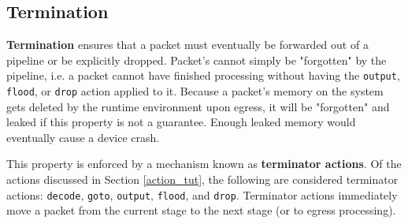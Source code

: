 %
%

\subsection{Termination} \label{termination_guide}

\textbf{Termination} ensures that a packet must eventually be forwarded out of a pipeline or be explicitly dropped. Packet's cannot simply be "forgotten" by the pipeline, i.e. a packet cannot have finished processing without having the \texttt{output}, \texttt{flood}, or \texttt{drop} action applied to it. Because a packet's memory on the system gets deleted by the runtime environment upon egress, it will be "forgotten" and leaked if this property is not a guarantee. Enough leaked memory would eventually cause a device crash.

This property is enforced by a mechanism known as \textbf{terminator actions}. Of the actions discussed in Section \ref{action_tut}, the following are considered terminator actions: \texttt{decode}, \texttt{goto}, \texttt{output}, \texttt{flood}, and \texttt{drop}. Terminator actions immediately move a packet from the current stage to the next stage (or to egress processing).

